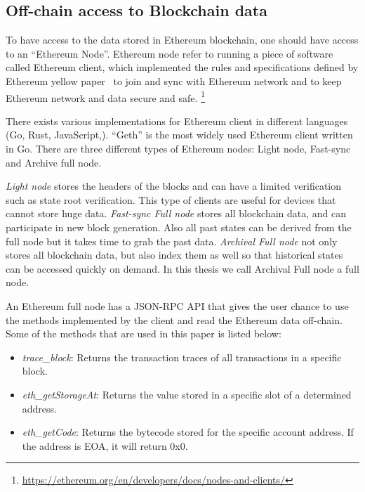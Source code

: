 
\subsection{Off-chain access to Blockchain data}\label{sec:nodes}

To have access to the data stored in Ethereum blockchain, one should have access to an ``Ethereum Node''. Ethereum node refer to running a piece of software called Ethereum client, which implemented the rules and specifications defined by Ethereum yellow paper~\cite{wood2014ethereum} to join and sync with Ethereum network and to keep Ethereum network and data secure and safe.
\footnote{\url{https://ethereum.org/en/developers/docs/nodes-and-clients/}} 

There exists various implementations for Ethereum client in different languages (\eg Go, Rust, JavaScript,\etc). ``Geth'' is the most widely used Ethereum client written in Go. 
There are three different types of Ethereum nodes: Light node, Fast-sync and Archive full node.

\textit{Light node} stores the headers of the blocks and can have a limited verification such as state root verification. This type of clients are useful for devices that cannot store huge data.
\textit{Fast-sync Full node} stores all blockchain data, and can participate in new block generation. Also all past states can be derived from the full node but it takes time to grab the past data.
\textit{Archival Full node} not only stores all blockchain data, but also index them as well so that historical states can be accessed quickly on demand. In this thesis we call Archival Full node a
full node. 

An Ethereum full node has a JSON-RPC API that gives the user chance to use the methods implemented by the client and read the Ethereum data off-chain. Some of the methods that are used in this paper is listed below:

\begin{itemize}
    \item \emph{trace\_block}: Returns the transaction traces of all transactions in a specific block.
    \item \emph{eth\_getStorageAt}: Returns the value stored in a specific slot of a determined address. 
    \item \emph{eth\_getCode}: Returns the bytecode stored for the specific account address. If the address is EOA, it will return 0x0.
\end{itemize}

